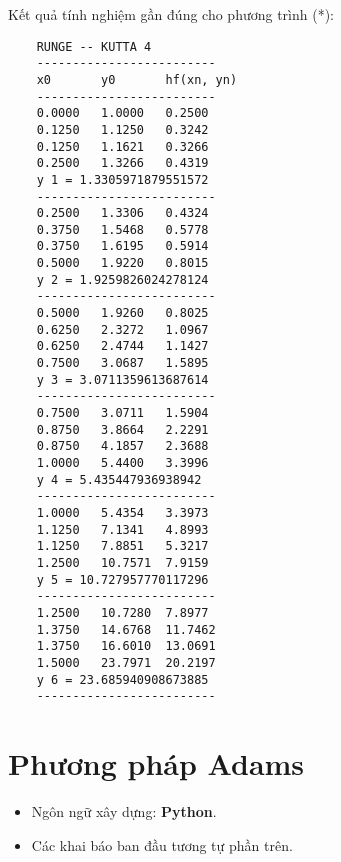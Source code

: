 Kết quả tính nghiệm gần đúng cho phương trình (*):
\begin{lstlisting}
	RUNGE -- KUTTA 4
	-------------------------
	x0       y0       hf(xn, yn)
	-------------------------
	0.0000   1.0000   0.2500
	0.1250   1.1250   0.3242
	0.1250   1.1621   0.3266
	0.2500   1.3266   0.4319
	y 1 = 1.3305971879551572
	-------------------------
	0.2500   1.3306   0.4324
	0.3750   1.5468   0.5778
	0.3750   1.6195   0.5914
	0.5000   1.9220   0.8015
	y 2 = 1.9259826024278124
	-------------------------
	0.5000   1.9260   0.8025
	0.6250   2.3272   1.0967
	0.6250   2.4744   1.1427
	0.7500   3.0687   1.5895
	y 3 = 3.0711359613687614
	-------------------------
	0.7500   3.0711   1.5904
	0.8750   3.8664   2.2291
	0.8750   4.1857   2.3688
	1.0000   5.4400   3.3996
	y 4 = 5.435447936938942
	-------------------------
	1.0000   5.4354   3.3973
	1.1250   7.1341   4.8993
	1.1250   7.8851   5.3217
	1.2500   10.7571  7.9159
	y 5 = 10.727957770117296
	-------------------------
	1.2500   10.7280  7.8977
	1.3750   14.6768  11.7462
	1.3750   16.6010  13.0691
	1.5000   23.7971  20.2197
	y 6 = 23.685940908673885
	-------------------------
\end{lstlisting}

\section{Phương pháp Adams}
\begin{itemize}
	\item Ngôn ngữ xây dựng: \textbf{Python}.
	\item Các khai báo ban đầu tương tự phần trên.
\end{itemize}

